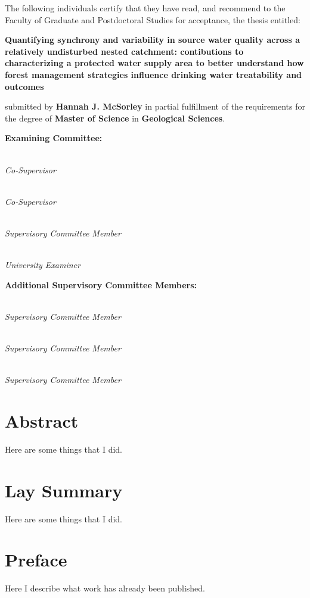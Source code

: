 
\noindent The following individuals certify that they have read,
and recommend to the Faculty of Graduate and Postdoctoral Studies
for acceptance, the thesis entitled:

\begin{center}
{\large \textbf{Quantifying synchrony and variability in source water quality across a relatively undisturbed nested catchment: contibutions to characterizing a protected water supply area to better understand how forest management strategies influence drinking water treatability and outcomes}}
\end{center}

submitted by \textbf{Hannah J. McSorley} in partial fulfillment of the requirements for the degree of \textbf{Master of Science} in \textbf{Geological Sciences}.%
\par\bigskip%

\noindent\textbf{Examining Committee:}%
\par\medskip{}\\\emph{Co-Supervisor}
\par\medskip{}\\\emph{Co-Supervisor}
\par\medskip\noindent{}\\\emph{Supervisory Committee Member}
\par\medskip\noindent{}\\\emph{University Examiner}
\par\bigskip%
\noindent\textbf{Additional Supervisory Committee Members:}%
\par\medskip\noindent{}\\\emph{Supervisory Committee Member}
\par\medskip\noindent{}\\\emph{Supervisory Committee Member}
\par\medskip\noindent{}\\\emph{Supervisory Committee Member}
\cleardoublepage

\chapter{Abstract}

Here are some things that I did.

\chapter{Lay Summary}

Here are some things that I did.

\chapter{Preface}

Here I describe what work has already been published.


